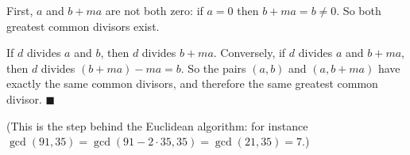 First, $a$ and $b+ma$ are not both zero: if $a=0$ then $b+ma=b\ne0$. So both greatest common divisors exist.

If $d$ divides $a$ and $b$, then $d$ divides $b+ma$. Conversely, if $d$ divides $a$ and $b+ma$, then $d$ divides $(b+ma)-ma=b$. So the pairs $(a,b)$ and $(a,b+ma)$ have exactly the same common divisors, and therefore the same greatest common divisor. $\blacksquare$

(This is the step behind the Euclidean algorithm: for instance $\gcd(91,35)=\gcd(91-2\cdot35,35)=\gcd(21,35)=7$.)
